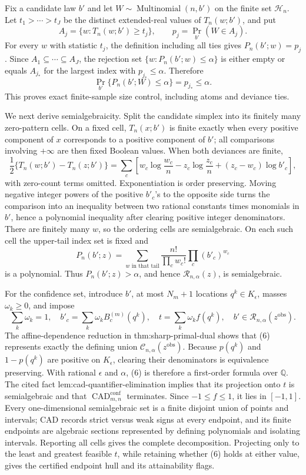 Fix a candidate law \(b'\) and let \(W\sim\operatorname{Multinomial}(n,b')\) on the finite set \(\mathcal H_n\).  Let \(t_1>\cdots>t_J\) be the distinct extended-real values of \(T_n(w;b')\), and put
\[
 A_j=\{w:T_n(w;b')\geq t_j\},
 \qquad p_j=\Pr_{b'}(W\in A_j).
\]
For every \(w\) with statistic \(t_j\), the definition including all ties gives \(P_n(b';w)=p_j\).  Since \(A_1\subseteq\cdots\subseteq A_J\), the rejection set \(\{w:P_n(b';w)\leq\alpha\}\) is either empty or equals \(A_{j_*}\) for the largest index with \(p_{j_*}\leq\alpha\).  Therefore
\[
 \Pr_{b'}\{P_n(b';W)\leq\alpha\}=p_{j_*}\leq\alpha.
\tag{5}
\]
This proves exact finite-sample size control, including atoms and deviance ties.

We next derive semialgebraicity.  Split the candidate simplex into its finitely many zero-pattern cells.  On a fixed cell, \(T_n(x;b')\) is finite exactly when every positive component of \(x\) corresponds to a positive component of \(b'\); all comparisons involving \(+\infty\) are then fixed Boolean values.  When both deviances are finite,
\[
 \frac12\{T_n(w;b')-T_n(z;b')\}
 =\sum_c\left[w_c\log\frac{w_c}{n}-z_c\log\frac{z_c}{n}
 +(z_c-w_c)\log b'_c\right],
\]
with zero-count terms omitted.  Exponentiation is order preserving.  Moving negative integer powers of the positive \(b'_c\)'s to the opposite side turns the comparison into an inequality between two rational constants times monomials in \(b'\), hence a polynomial inequality after clearing positive integer denominators.  There are finitely many \(w\), so the ordering cells are semialgebraic.  On each such cell the upper-tail index set is fixed and
\[
 P_n(b';z)=\sum_{w\text{ in that tail}}
 \frac{n!}{\prod_cw_c!}\prod_c(b'_c)^{w_c}
\]
is a polynomial.  Thus \(P_n(b';z)>\alpha\), and hence \(\mathcal R_{n,\alpha}(z)\), is semialgebraic.

For the confidence set, introduce \(b'\), at most \(N_m+1\) locations \(q^k\in K_{\epsilon}\), masses \(\omega_k\geq0\), and impose
\[
 \sum_k\omega_k=1,
 \quad b'_c=\sum_k\omega_kB_c^{(m)}(q^k),
 \quad t=\sum_k\omega_kf(q^k),
 \quad b'\in\mathcal R_{n,\alpha}(z^{\mathrm{obs}}).
\tag{6}
\]
The affine-dependence reduction in thm:sharp-primal-dual shows that (6) represents exactly the defining union \(\mathcal C_{n,\alpha}(z^{\mathrm{obs}})\).  Because \(p(q^k)\) and \(1-p(q^k)\) are positive on \(K_{\epsilon}\), clearing their denominators is equivalence preserving.  With rational \(\epsilon\) and \(\alpha\), (6) is therefore a first-order formula over \(\mathbb Q\).  The cited fact lem:cad-quantifier-elimination implies that its projection onto \(t\) is semialgebraic and that \(\operatorname{CAD}^{\mathrm{conf}}_{m,n}\) terminates.  Since \(-1\leq f\leq1\), it lies in \([-1,1]\).  Every one-dimensional semialgebraic set is a finite disjoint union of points and intervals; CAD records strict versus weak signs at every endpoint, and its finite endpoints are algebraic sections represented by defining polynomials and isolating intervals.  Reporting all cells gives the complete decomposition.  Projecting only to the least and greatest feasible \(t\), while retaining whether (6) holds at either value, gives the certified endpoint hull and its attainability flags.